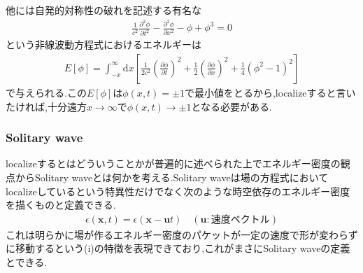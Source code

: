 \documentclass[dvipdfmx,11pt,a4paper]{jsbook}
\begin{document}
他には自発的対称性の破れを記述する有名な
\begin{align}
    \frac{1}{c^{2}} \frac{\partial^{2} \phi}{\partial t^{2}}-\frac{\partial^{2} \phi}{\partial x^{2}}-\phi+\phi^{3}=0
\end{align}
という非線波動方程式におけるエネルギーは
\begin{align}
    E[\phi]=\int_{-x}^{\infty} \mathrm{d} x\left[\frac{1}{2 c^{2}}\left(\frac{\partial \phi}{\partial t}\right)^{2}+\frac{1}{2}\left(\frac{\partial \phi}{\partial x}\right)^{2}+\frac{1}{4}\left(\phi^{2}-1\right)^{2}\right]
\end{align}
で与えられる.この$E[\phi]$は$\phi(x,t)=\pm 1$で最小値をとるから,localizeすると言いたければ,十分遠方$x\rightarrow \infty$で$\phi(x,t)\rightarrow \pm 1$となる必要がある.

\subsubsection{Solitary wave}
localizeするとはどういうことかが普遍的に述べられた上でエネルギー密度の観点からSolitary waveとは何かを考える.Solitary waveは場の方程式においてlocalizeしているという特異性だけでなく次のような時空依存のエネルギー密度を描くものと定義できる.
\begin{align}
    \epsilon(\bm{x},t)=\epsilon(\bm{x}-\bm{u}t)\quad (\bm{u}: \text{速度ベクトル})\label{eq:2.8}
\end{align}
これは明らかに場が作るエネルギー密度のパケットが一定の速度で形が変わらずに移動するという(i)の特徴を表現できており,これがまさにSolitary  waveの定義とできる.
\end{document}

